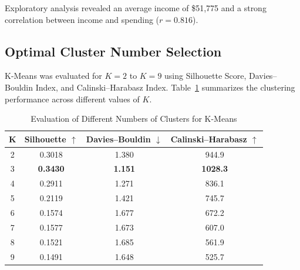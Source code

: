 \documentclass[twoside]{article}
\begin{document}
Exploratory analysis revealed an average income of \$51,775 and a strong correlation between income and spending (\(r=0.816\)). 


\subsection{Optimal Cluster Number Selection}

K-Means was evaluated for \(K=2\) to \(K=9\) using Silhouette Score, Davies–Bouldin Index, and Calinski--Harabasz Index. Table~\ref{tab:k_selection} summarizes the clustering performance across different values of \(K\).

\begin{table}[htbp]
\centering
\caption{Evaluation of Different Numbers of Clusters for K-Means}
\label{tab:k_selection}
\footnotesize
\renewcommand{\arraystretch}{1.1}
\begin{tabular}{cccc}
\hline
\textbf{K} &
\textbf{Silhouette} $\uparrow$ &
\textbf{Davies--Bouldin} $\downarrow$ &
\textbf{Calinski--Harabasz} $\uparrow$ \\
\hline

2 & 0.3018 & 1.380 & 944.9 \\
3 & \textbf{0.3430} & \textbf{1.151} & \textbf{1028.3} \\
4 & 0.2911 & 1.271 & 836.1 \\
5 & 0.2119 & 1.421 & 745.7 \\
6 & 0.1574 & 1.677 & 672.2 \\
7 & 0.1577 & 1.673 & 607.0 \\
8 & 0.1521 & 1.685 & 561.9 \\
9 & 0.1491 & 1.648 & 525.7 \\

\hline
\end{tabular}
\end{table}
\end{document}

